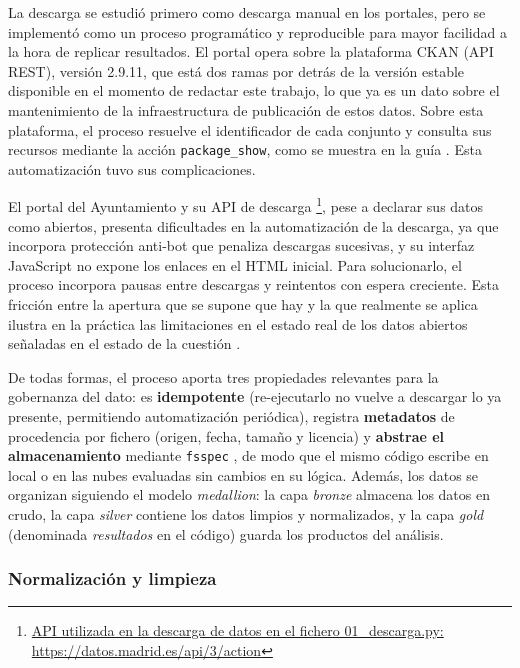 La descarga se estudió primero como descarga manual en los portales, pero se implementó como un proceso programático y reproducible para mayor facilidad a la hora de replicar resultados. El portal opera sobre la plataforma CKAN \citep{CKAN2024Software} (API REST), versión 2.9.11, que está dos ramas por detrás de la versión estable disponible en el momento de redactar este trabajo, lo que ya es un dato sobre el mantenimiento de la infraestructura de publicación de estos datos. Sobre esta plataforma, el proceso resuelve el identificador de cada conjunto y consulta sus recursos mediante la acción \texttt{package\_show}, como se muestra en la guía \citep{CKAN2024ApiGuide}. Esta automatización tuvo sus complicaciones.

El portal del Ayuntamiento y su API de descarga \footnote{\url{API utilizada en la descarga de datos en el fichero 01\_descarga.py: https://datos.madrid.es/api/3/action}}, pese a declarar sus datos como abiertos, presenta dificultades en la automatización de la descarga, ya que incorpora protección anti-bot que penaliza descargas sucesivas, y su interfaz JavaScript no expone los enlaces en el HTML inicial. Para solucionarlo, el proceso incorpora pausas entre descargas y reintentos con espera creciente. Esta fricción entre la apertura que se supone que hay y la que realmente se aplica ilustra en la práctica las limitaciones en el estado real de los datos abiertos señaladas en el estado de la cuestión \citep{verhulst2020, OECD2023openData}.

De todas formas, el proceso aporta tres propiedades relevantes para la gobernanza del dato: es \textbf{idempotente} (re-ejecutarlo no vuelve a descargar lo ya presente, permitiendo automatización periódica), registra \textbf{metadatos} de procedencia por fichero (origen, fecha, tamaño y licencia) y \textbf{abstrae el almacenamiento} mediante \texttt{fsspec} \citep{fsspec2024}, de modo que el mismo código escribe en local o en las nubes evaluadas sin cambios en su lógica. Además, los datos se organizan siguiendo el modelo \textit{medallion}: la capa \textit{bronze} almacena los datos en crudo, la capa \textit{silver} contiene los datos limpios y normalizados, y la capa \textit{gold} (denominada \textit{resultados} en el código) guarda los productos del análisis.

\subsubsection{Normalización y limpieza} \label{sec:Metodos_limpieza}

